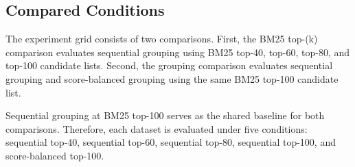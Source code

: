 \subsection{Compared Conditions}

The experiment grid consists of two comparisons. First, the BM25 top-(k) comparison evaluates sequential grouping using BM25 top-40, top-60, top-80, and top-100 candidate lists. Second, the grouping comparison evaluates sequential grouping and score-balanced grouping using the same BM25 top-100 candidate list.

Sequential grouping at BM25 top-100 serves as the shared baseline for both comparisons. Therefore, each dataset is evaluated under five conditions: sequential top-40, sequential top-60, sequential top-80, sequential top-100, and score-balanced top-100.
